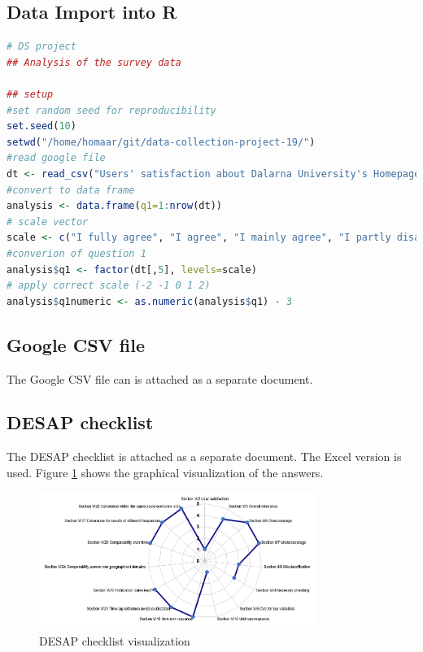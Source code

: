 \documentclass[12pt,a4paper,paper=a4,oneside,titlepage,pdftex]{scrartcl}
\begin{document}
\subsection{Data Import into R}
\begin{lstlisting}[caption={Data Import into R and first analysis steps},label={lst:r-import},language=R]
# DS project
## Analysis of the survey data

## setup
#set random seed for reproducibility
set.seed(10)
setwd("/home/homaar/git/data-collection-project-19/")
#read google file
dt <- read_csv("Users' satisfaction about Dalarna University's Homepage.csv")
#convert to data frame
analysis <- data.frame(q1=1:nrow(dt))
# scale vector
scale <- c("I fully agree", "I agree", "I mainly agree", "I partly disagree", "I disagree")
#converion of question 1
analysis$q1 <- factor(dt[,5], levels=scale)
# apply correct scale (-2 -1 0 1 2)
analysis$q1numeric <- as.numeric(analysis$q1) - 3
\end{lstlisting}

\subsection{Google CSV file}
The Google CSV file can is attached as a separate document.

\subsection{DESAP checklist}
The DESAP checklist is attached as a separate document. The Excel version is used. Figure \ref{fig:desap} shows the graphical visualization of the answers.

\begin{figure}[h!]
    \centering
    \includegraphics[width=0.8\textwidth]{figures/desap-graph.PNG}
    \caption{DESAP checklist visualization}
    \label{fig:desap}
\end{figure}
\end{document}

